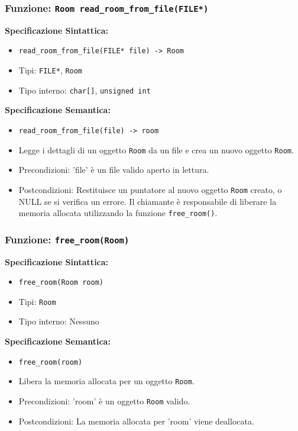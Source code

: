 \documentclass[11pt]{scrartcl} %
\begin{document}
\subsubsection{Funzione: \texttt{Room read\_room\_from\_file(FILE*)}}

\textbf{Specificazione Sintattica:}
\begin{itemize}
	\item \texttt{read\_room\_from\_file(FILE* file) -> Room}
	\item Tipi: \texttt{FILE*}, \texttt{Room}
	\item Tipo interno: \texttt{char[]}, \texttt{unsigned int}
\end{itemize}

\textbf{Specificazione Semantica:}
\begin{itemize}
	\item \texttt{read\_room\_from\_file(file) -> room}
	\item Legge i dettagli di un oggetto \texttt{Room} da un file e crea un nuovo oggetto \texttt{Room}.
	\item Precondizioni: 'file' è un file valido aperto in lettura.
	\item Postcondizioni: Restituisce un puntatore al nuovo oggetto \texttt{Room} creato, o NULL se si verifica un errore. Il chiamante è responsabile di liberare la memoria allocata utilizzando la funzione \texttt{free\_room()}.
\end{itemize}

\subsubsection{Funzione: \texttt{free\_room(Room)}}

\textbf{Specificazione Sintattica:}
\begin{itemize}
	\item \texttt{free\_room(Room room)}
	\item Tipi: \texttt{Room}
	\item Tipo interno: Nessuno
\end{itemize}

\textbf{Specificazione Semantica:}
\begin{itemize}
	\item \texttt{free\_room(room)}
	\item Libera la memoria allocata per un oggetto \texttt{Room}.
	\item Precondizioni: 'room' è un oggetto \texttt{Room} valido.
	\item Postcondizioni: La memoria allocata per 'room' viene deallocata.
\end{itemize}
\end{document}
